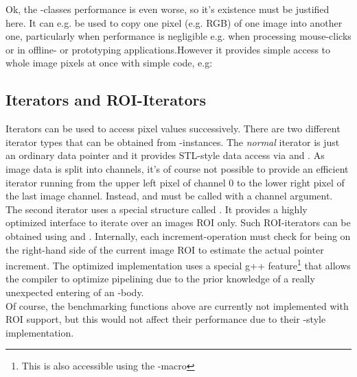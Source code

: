 
Ok, the -classes performance is even worse, so it's existence must be justified here. It can e.g. be used to copy one pixel (e.g. RGB) of one image into another one, particularly when performance is negligible e.g. when processing mouse-clicks or in offline- or prototyping applications.However it provides simple access to whole image pixels at once with simple code, e.g: 



\subsection{Iterators and ROI-Iterators}

Iterators can be used to access pixel values successively. There are two different iterator types that can be obtained from -instances. The \emph{normal} iterator is just an ordinary data pointer and it provides STL-style data access via   and . As image data is split into channels, it's of course not possible to provide an efficient iterator running from the upper left pixel of channel $0$ to the lower right pixel of the last image channel. Instead,  and  must be called with a channel argument.\\
The second iterator uses a special structure called  . It provides a highly optimized interface to iterate over an images ROI only. Such ROI-iterators can be obtained using  and . Internally, each increment-operation must check for being on the right-hand side of the current image ROI to estimate the actual pointer increment. The optimized implementation uses a special g++ feature\footnote{This is also accessible using the -macro } that allows the compiler to optimize pipelining due to the prior knowledge of a really unexpected entering of an -body.\\
Of course, the benchmarking functions above are currently not implemented with ROI support, but this would not affect their performance due to their -style implementation. 


